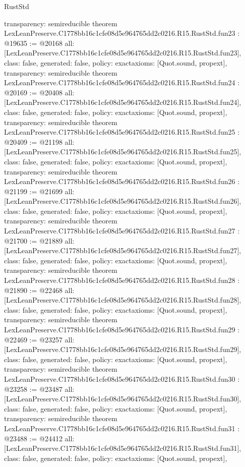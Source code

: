 \begin{lexlean}{RustStd}
\begin{coremodule}
{  transparency: semireducible
}
theorem LexLeanPreserve.C1778bb16c1cfe08d5e964765dd2c0216.R15.RustStd.fun23 : @19635 := @20168 {
  all: [LexLeanPreserve.C1778bb16c1cfe08d5e964765dd2c0216.R15.RustStd.fun23],
  class: false,
  generated: false,
  policy: exact{axioms: [Quot.sound, propext]},
  transparency: semireducible
}
theorem LexLeanPreserve.C1778bb16c1cfe08d5e964765dd2c0216.R15.RustStd.fun24 : @20169 := @20408 {
  all: [LexLeanPreserve.C1778bb16c1cfe08d5e964765dd2c0216.R15.RustStd.fun24],
  class: false,
  generated: false,
  policy: exact{axioms: [Quot.sound, propext]},
  transparency: semireducible
}
theorem LexLeanPreserve.C1778bb16c1cfe08d5e964765dd2c0216.R15.RustStd.fun25 : @20409 := @21198 {
  all: [LexLeanPreserve.C1778bb16c1cfe08d5e964765dd2c0216.R15.RustStd.fun25],
  class: false,
  generated: false,
  policy: exact{axioms: [Quot.sound, propext]},
  transparency: semireducible
}
theorem LexLeanPreserve.C1778bb16c1cfe08d5e964765dd2c0216.R15.RustStd.fun26 : @21199 := @21699 {
  all: [LexLeanPreserve.C1778bb16c1cfe08d5e964765dd2c0216.R15.RustStd.fun26],
  class: false,
  generated: false,
  policy: exact{axioms: [Quot.sound, propext]},
  transparency: semireducible
}
theorem LexLeanPreserve.C1778bb16c1cfe08d5e964765dd2c0216.R15.RustStd.fun27 : @21700 := @21889 {
  all: [LexLeanPreserve.C1778bb16c1cfe08d5e964765dd2c0216.R15.RustStd.fun27],
  class: false,
  generated: false,
  policy: exact{axioms: [Quot.sound, propext]},
  transparency: semireducible
}
theorem LexLeanPreserve.C1778bb16c1cfe08d5e964765dd2c0216.R15.RustStd.fun28 : @21890 := @22468 {
  all: [LexLeanPreserve.C1778bb16c1cfe08d5e964765dd2c0216.R15.RustStd.fun28],
  class: false,
  generated: false,
  policy: exact{axioms: [Quot.sound, propext]},
  transparency: semireducible
}
theorem LexLeanPreserve.C1778bb16c1cfe08d5e964765dd2c0216.R15.RustStd.fun29 : @22469 := @23257 {
  all: [LexLeanPreserve.C1778bb16c1cfe08d5e964765dd2c0216.R15.RustStd.fun29],
  class: false,
  generated: false,
  policy: exact{axioms: [Quot.sound, propext]},
  transparency: semireducible
}
theorem LexLeanPreserve.C1778bb16c1cfe08d5e964765dd2c0216.R15.RustStd.fun30 : @23258 := @23487 {
  all: [LexLeanPreserve.C1778bb16c1cfe08d5e964765dd2c0216.R15.RustStd.fun30],
  class: false,
  generated: false,
  policy: exact{axioms: [Quot.sound, propext]},
  transparency: semireducible
}
theorem LexLeanPreserve.C1778bb16c1cfe08d5e964765dd2c0216.R15.RustStd.fun31 : @23488 := @24412 {
  all: [LexLeanPreserve.C1778bb16c1cfe08d5e964765dd2c0216.R15.RustStd.fun31],
  class: false,
  generated: false,
  policy: exact{axioms: [Quot.sound, propext]},
}
\end{coremodule}
\end{lexlean}
